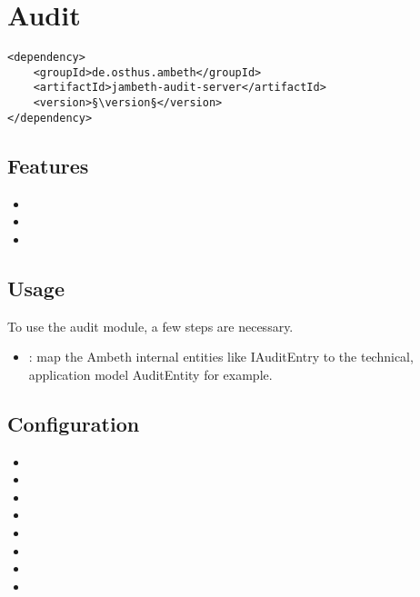 \section{Audit}
\label{module:Audit}
\ClearAPI
\begin{lstlisting}[style=POM,caption={Maven modules to use \emph{Ambeth Audit}}]
<dependency>
	<groupId>de.osthus.ambeth</groupId>
	<artifactId>jambeth-audit-server</artifactId>
	<version>§\version§</version>
</dependency>
\end{lstlisting}
\TODO
\subsection{Features}
\begin{itemize}
	\item {}
	\item {}
	\item {}
\end{itemize}
\subsection{Usage}
To use the audit module, a few steps are necessary.
\begin{itemize}

	\item {}: map the Ambeth internal entities like IAuditEntry to the technical, application model AuditEntity for example.


	
\end{itemize}

\subsection{Configuration}
\begin{itemize}
	\item {}
	\item {}
	\item {}
	\item {}
	\item {}
	\item {}
	\item {}
	\item {}
\end{itemize}

